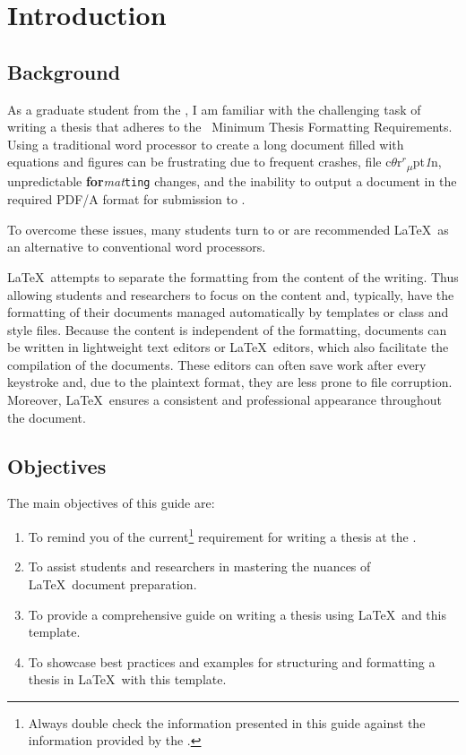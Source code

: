 \chapter{Introduction}\label{ch:introduction}
	\section{Background}
		As a graduate student from the \University, I am familiar with the challenging task of writing a thesis that adheres to the \Faculty\ Minimum Thesis Formatting Requirements.
		Using a traditional word processor to create a long document filled with equations and figures can be frustrating due to frequent crashes, file c\(\theta\)r\(^r\)\textsubscript{$\mu$}pt\textit{1}n, unpredictable \textbf{for}\textit{mat}\texttt{ting} changes, and the inability to output a document in the required PDF/A format for submission to \Fac.

		To overcome these issues, many students turn to or are recommended \LaTeX\ as an alternative to conventional word processors.
		
		\LaTeX\ attempts to separate the formatting from the content of the writing.
		Thus allowing students and researchers to focus on the content and, typically, have the formatting of their documents managed automatically by templates or class and style files.
		Because the content is independent of the formatting, documents can be written in lightweight text editors or \LaTeX\ editors, which also facilitate the compilation of the documents.
		These editors can often save work after every keystroke and, due to the plaintext format, they are less prone to file corruption.
		Moreover, \LaTeX\ ensures a consistent and professional appearance throughout the document.

	\section{Objectives}
		The main objectives of this guide are:
		\begin{enumerate}
			\item To remind you of the current\footnote{Always double check the information presented in this guide against the information provided by the \Faculty.} requirement for writing a thesis at the \University.
			\item To assist students and researchers in mastering the nuances of \LaTeX\ document preparation.
			\item To provide a comprehensive guide on writing a thesis using \LaTeX\ and this template.
			\item To showcase best practices and examples for structuring and formatting a thesis in \LaTeX\ with this template.
		\end{enumerate}

